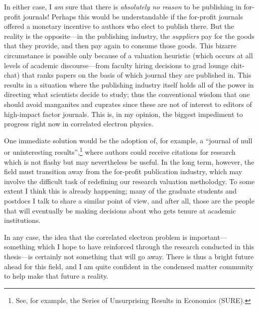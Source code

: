 In either case, I \emph{am} sure that there is \emph{absolutely no reason} to be publishing in for-profit journals!
Perhaps this would be understandable if the for-profit journals offered a monetary incentive to authors who elect to publish there.
But the reality is the opposite---in the publishing industry, the \emph{suppliers} pay for the goods that they provide, and then pay again to consume those goods.
This bizarre circumstance is possible only because of a valuation heuristic (which occurs at all levels of academic discourse---from faculty hiring decisions to grad lounge chit-chat) that ranks papers on the basis of which journal they are published in.
This results in a situation where the publishing industry itself holds all of the power in directing what scientists decide to study; thus the conventional wisdom that one should avoid manganites and cuprates since these are not of interest to editors of high-impact factor journals.
This is, in my opinion, the biggest impediment to progress right now in correlated electron physics.

One immediate solution would be the adoption of, for example, a ``journal of null or uninteresting results'',\footnote{See, for example, the Series of Unsurprising Results in Economics (SURE).} where authors could receive citations for research which is not flashy but may nevertheless be useful.
In the long term, however, the field must transition away from the for-profit publication industry, which may involve the difficult task of redefining our research valuation metholodgy.
To some extent I think this is already happening; many of the graduate students and postdocs I talk to share a similar point of view, and after all, those are the people that will eventually be making decisions about who gets tenure at academic institutions.

In any case, the idea that the correlated electron problem is important---something which I hope to have reinforced through the research conducted in this thesis---is certainly not something that will go away.
There is thus a bright future ahead for this field, and I am quite confident in the condensed matter community to help make that future a reality.
